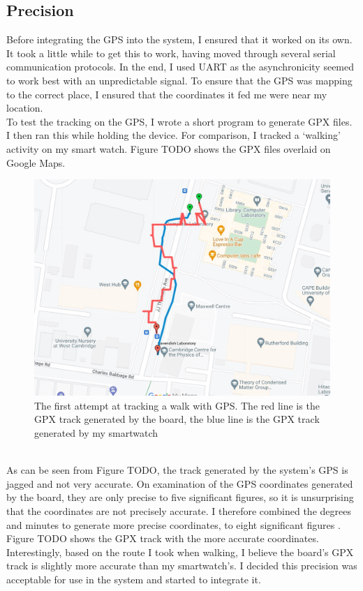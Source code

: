 \documentclass[12pt,a4paper]{report}
\begin{document}
\subsection{Precision}
Before integrating the GPS into the system, I ensured that it worked on its own. It took a little while to get this to work, having moved through several serial communication protocols. In the end, I used UART as the asynchronicity seemed to work best with an unpredictable signal. To ensure that the GPS was mapping to the correct place, I ensured that the coordinates it fed me were near my location. \\
To test the tracking on the GPS, I wrote a short program to generate GPX files. I then ran this while holding the device. For comparison, I tracked a `walking' activity on my smart watch. Figure TODO shows the GPX files overlaid on Google Maps. \\
\begin{figure}
\begin{center}
\includegraphics[scale=0.4]{gps1.jpg}
\end{center}
\caption{The first attempt at tracking a walk with GPS. The red line is the GPX track generated by the board, the blue line is the GPX track generated by my smartwatch \cite{googlemapsgeneral}}
\end{figure}\\ 
As can be seen from Figure TODO, the track generated by the system's GPS is jagged and not very accurate. On examination of the GPS coordinates generated by the board, they are only precise to five significant figures, so it is unsurprising that the coordinates are not precisely accurate. I therefore combined the degrees and minutes to generate more precise coordinates, to eight significant figures . Figure TODO shows the GPX track with the more accurate coordinates. Interestingly, based on the route I took when walking, I believe the board's GPX track is slightly more accurate than my smartwatch's. I decided this precision was acceptable for use in the system and started to integrate it. 
\end{document}
